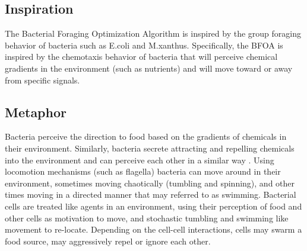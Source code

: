 \subsection{Inspiration}
The Bacterial Foraging Optimization Algorithm is inspired by the group foraging behavior of bacteria such as E.coli and M.xanthus.
Specifically, the BFOA is inspired by the chemotaxis behavior of bacteria that will perceive chemical gradients in the environment (such as nutrients) and will move toward or away from specific signals.

\subsection{Metaphor}
Bacteria perceive the direction to food based on the gradients of chemicals in their environment. Similarly, bacteria secrete attracting and repelling chemicals into the environment and can perceive each other in a similar way . Using locomotion mechanisms (such as flagella) bacteria can move around in their environment, sometimes moving chaotically (tumbling and spinning), and other times moving in a directed manner that may referred to as swimming. Bacterial cells are treated like agents in an environment, using their perception of food and other cells as motivation to move, and stochastic tumbling and swimming like movement to re-locate. Depending on the cell-cell interactions, cells may swarm a food source, may aggressively repel or ignore each other.

